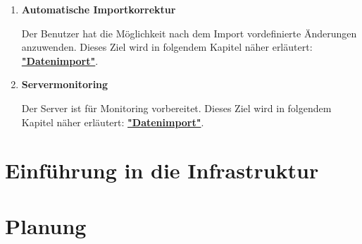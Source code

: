 \documentclass[
    headings=optiontotocandhead,%
    twoside,
    numbers=noenddot,%
    toc=flat, %
    12pt, %
    titlepage, %
    parskip=full, %
    listof=totoc, %
    listof=flat, %
    numbers=noenddot, %
    bibliography=totoc, %
    a4paper,DIV=14,
    BCOR=15mm,
]{scrbook}
\begin{document}
\begin{enumerate}
  \item \textbf{Automatische Importkorrektur}

  Der Benutzer hat die Möglichkeit nach dem Import vordefinierte Änderungen anzuwenden.
  Dieses Ziel wird in folgendem Kapitel näher erläutert: \textbf{\href{datenimport}{"Datenimport"}}.




  \item \textbf{Servermonitoring}

  Der Server ist für Monitoring vorbereitet.
  Dieses Ziel wird in folgendem Kapitel näher erläutert: \textbf{\href{datenimport}{"Datenimport"}}.
\end{enumerate}



%

\renewcommand{\kapitelautor}{Autor: Josip Domazet}



\renewcommand{\kapitelautor}{Autor: Mathias Möller}



\chapter{Einführung in die Infrastruktur}
\renewcommand{\kapitelautor}{Autor: Hannes Weiss}




\renewcommand{\kapitelautor}{}

\chapter{Planung}


% 
\end{document}
